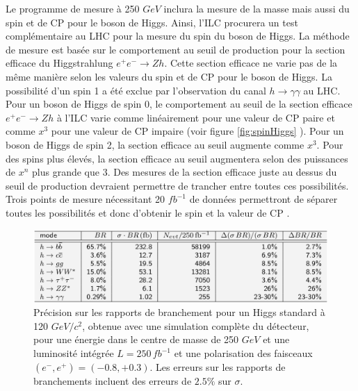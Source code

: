    Le programme de mesure \`a 250 $GeV$ inclura la mesure de la masse mais aussi du spin et de CP pour le boson de Higgs. Ainsi, l'ILC procurera un test complémentaire au LHC pour la mesure du spin du boson de Higgs. La m\'ethode de mesure est bas\'ee sur le comportement au seuil de production pour la section efficace du Higgstrahlung $e^+ e^- \rightarrow Zh$. Cette section efficace ne varie pas de la m\^eme mani\`ere selon les valeurs du spin et de CP pour le boson de Higgs. La possibilit\'e d'un spin 1 a \'et\'e exclue par l'observation du canal $h\rightarrow \gamma \gamma$ au LHC. Pour un boson de Higgs de spin 0, le comportement au seuil de la section efficace $e^+ e^- \rightarrow Zh$ \`a l'ILC varie comme lin\'eairement pour une valeur de CP paire et comme $x^3$ pour une valeur de CP impaire (voir figure \ref{fig:spinHiggs} \cite{Dova:2003py}). Pour un boson de Higgs de spin 2, la section efficace au seuil augmente comme $x^3$. Pour des spins plus \'elev\'es, la section efficace au seuil augmentera selon des puissances de $x^n$ plus grande que 3. Des mesures de la section efficace juste au dessus du seuil de production devraient permettre de trancher entre toutes ces possibilit\'es. Trois points de mesure nécessitant 20 $fb^{-1}$ de donn\'ees permettront de s\'eparer toutes les possibilit\'es et donc d'obtenir le spin et la valeur de CP \cite{Dova:2003py}.   
   
   \medskip


   \begin{figure}[!htb]
   \renewcommand{\figurename}{Table}
   \begin{center} 
      \includegraphics[scale=0.38]{./figures/table_BR_Higgs_MS.png}
      \caption{ Pr\'ecision sur les rapports de branchement pour un Higgs standard \`a 120 $GeV/c^2$, obtenue avec une simulation compl\`ete du d\'etecteur, pour une \'energie dans le centre de masse de 250 $GeV$ et une luminosit\'e int\'egr\'ee $L = 250 \, fb^{-1}$ et une polarisation des faisceaux $(e^- , e^+ ) = (-0.8, +0.3)$. Les erreurs sur les rapports de branchements incluent des erreurs de $2.5 \%$ sur $\sigma$. \cite{Ono:2013sea}}
     \label{fig:BR_SM_Higgs}
     \end{center}
  \end{figure}
  
